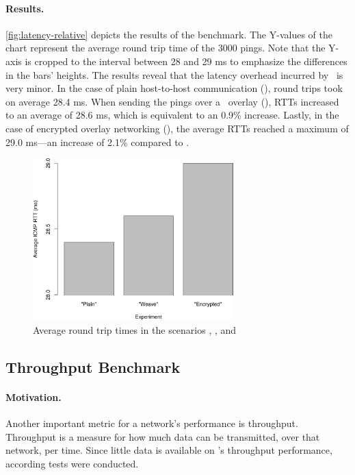 \paragraph{Results.} \autoref{fig:latency-relative} depicts the results of the benchmark. The Y-values of the chart represent the average round trip time of the 3000 pings. Note that the Y-axis is cropped to the interval between 28 and 29 ms to emphasize the differences in the bars' heights. The results reveal that the latency overhead incurred by \wnet\ is very minor. In the case of plain host-to-host communication (), round trips took on average 28.4 ms. When sending the pings over a \weave\ overlay (), RTTs increased to an average of 28.6 ms, which is equivalent to an 0.9\% increase. Lastly, in the case of encrypted overlay networking (), the average RTTs reached a maximum of 29.0 ms---an increase of 2.1\% compared to .
\begin{figure}[htpb]
  \centering
  \includegraphics[width=0.69\textwidth]{figures/ping-bar}
  \caption[\weave\ latency experiment results]{Average round trip times in the scenarios , , and }\label{fig:latency-relative}
\end{figure}
%
%
%
%
%
%
%
%
%
%
\subsection{Throughput Benchmark} \label{sec:throughput}
\paragraph{Motivation.} Another important metric for a network's performance is throughput. Throughput is a measure for how much data can be transmitted, over that network, per time. Since little data is available on \wnet 's throughput performance, according tests were conducted.

